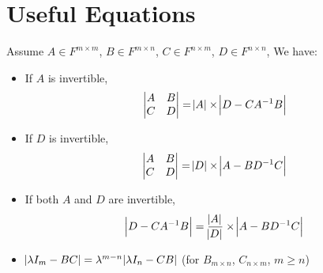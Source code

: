 \section{Useful Equations}
\begin{theorem}
    Assume $A \in F^{m \times m}$, $B \in F^{m \times n}$, $C \in F^{n \times m}$, $D \in F^{n \times n}$, We have:
    \begin{itemize}
        \item If $A$ is invertible, \begin{equation}
            \begin{vmatrix}
                A & B \\
                C & D
                \end{vmatrix} = \abs{A} \times \abs{D - C {A}^{-1} B}
        \end{equation}
    \item If $D$ is invertible, \begin{equation}
            \begin{vmatrix}
                A & B \\
                C & D
                \end{vmatrix} = \abs{D} \times \abs{A - B {D}^{-1} C}
        \end{equation}
    \item If both $A$ and $D$ are invertible, \begin{equation}
        \abs{D - C {A}^{-1} B} = \frac{\abs{A}}{\abs{D}} \times \abs{A - B {D}^{-1} C}
        \end{equation}
    \item $\abs{\lambda I_m - BC} =\lambda^{m-n} \abs{\lambda I_n - CB}$ (for $B_{m \times n}$, $C_{n \times m}$, $m \geq n$)
    \end{itemize}
\end{theorem}


